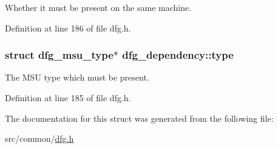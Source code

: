 Whether it must be present on the same machine. 



Definition at line 186 of file dfg.\-h.

\hypertarget{structdfg__dependency_a0aa6bde8bdcb9cbf14d8ceb86552af21}{
\subsubsection[{type}]{\setlength{\rightskip}{0pt plus 5cm}struct {\bf dfg\-\_\-msu\-\_\-type}$\ast$ dfg\-\_\-dependency\-::type}}\label{structdfg__dependency_a0aa6bde8bdcb9cbf14d8ceb86552af21}


The M\-S\-U type which must be present. 



Definition at line 185 of file dfg.\-h.



The documentation for this struct was generated from the following file\-:\begin{DoxyCompactItemize}
\item 
src/common/\hyperlink{dfg_8h}{dfg.\-h}\end{DoxyCompactItemize}

